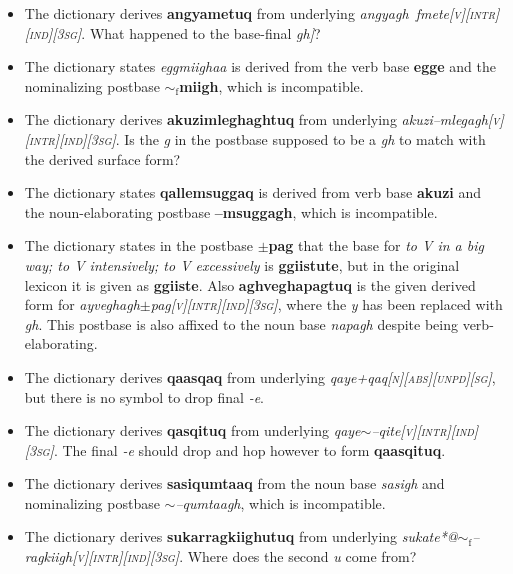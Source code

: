 \documentclass{article}
\begin{document}
\begin{itemize}
\item The dictionary derives \textbf{angyametuq} from underlying \textit{angyagh~fmete\textsc{[v][intr][ind][3sg]}}. What happened to the base-final \textit{gh]}?

\item The dictionary states \textit{eggmiighaa} is derived from the verb base \textbf{egge} and the nominalizing postbase \textbf{$\sim_\text{f}$miigh}, which is incompatible.

\item The dictionary derives \textbf{akuzimleghaghtuq} from underlying \textit{akuzi--mlegagh\textsc{[v][intr][ind][3sg]}}. Is the \textit{g} in the postbase supposed to be a \textit{gh} to match with the derived surface form?

\item The dictionary states \textbf{qallemsuggaq} is derived from verb base \textbf{akuzi} and the noun-elaborating postbase \textbf{--msuggagh}, which is incompatible.

\item The dictionary states in the postbase \textbf{$\pm$pag} that the base for \textit{to V in a big way; to V intensively; to V excessively} is \textbf{ggiistute}, but in the  original lexicon it is given as \textbf{ggiiste}. Also \textbf{aghveghapagtuq} is the given derived form for \textit{ayveghagh$\pm$pag\textsc{[v][intr][ind][3sg]}}, where the \textit{y} has been replaced with \textit{gh}. This postbase is also affixed to the noun base \textit{napagh} despite being verb-elaborating.

\item The dictionary derives \textbf{qaasqaq} from underlying \textit{qaye+qaq\textsc{[n][abs][unpd][sg]}}, but there is no symbol to drop final \textit{-e}.

\item The dictionary derives \textbf{qasqituq} from underlying \textit{qaye$\sim$--qite\textsc{[v][intr][ind][3sg]}}. The final \textit{-e} should drop and hop however to form \textbf{qaasqituq}.

\item The dictionary derives \textbf{sasiqumtaaq} from the noun base \textit{sasigh} and nominalizing postbase \textit{$\sim$--qumtaagh}, which is incompatible.

\item The dictionary derives \textbf{sukarragkiighutuq} from underlying \textit{sukate*@$\sim_\text{f}$--ragkiigh\textsc{[v][intr][ind][3sg]}}. Where does the second \textit{u} come from?


\end{itemize}
\end{document}
